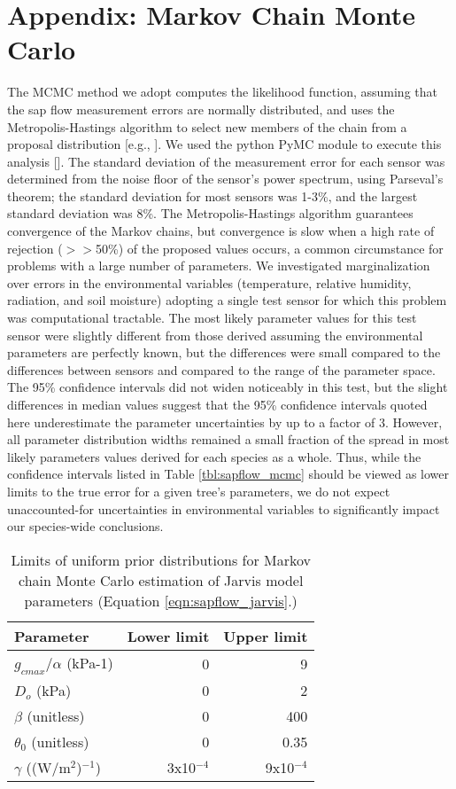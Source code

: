 \section{Appendix: Markov Chain Monte Carlo}
\label{sec:sapflow_appendix}

The MCMC method we adopt computes the likelihood function, assuming that the sap flow measurement errors are normally distributed, and uses the Metropolis-Hastings algorithm to select new members of the chain from a proposal distribution [e.g., \cite{sivia1996data}]. We used the python PyMC module to execute this analysis [\cite{patil}]. The standard deviation of the measurement error for each sensor was determined from the noise floor of the sensor's power spectrum, using Parseval's theorem; the standard deviation for most sensors was 1-3\%, and the largest standard deviation was 8\%.  The Metropolis-Hastings algorithm guarantees convergence of the Markov chains, but convergence is slow when a high rate of rejection ($>>$50\%) of the proposed values occurs, a common circumstance for problems with a large number of parameters.  We investigated marginalization over errors in the environmental variables (temperature, relative humidity, radiation, and soil moisture) adopting a single test sensor for which this problem was computational tractable.  The most likely parameter values for this test sensor were slightly different from those derived assuming the environmental parameters are perfectly known, but the differences were small compared to the differences between sensors and compared to the range of the parameter space.  The 95\% confidence intervals did not widen noticeably in this test, but the slight differences in median values suggest that the 95\% confidence intervals quoted here underestimate the parameter uncertainties by up to a factor of 3.  However, all parameter distribution widths remained a small fraction of the spread in most likely parameters values derived for each species as a whole.  Thus, while the confidence intervals listed in Table \ref{tbl:sapflow_mcmc} should be viewed as lower limits to the true error for a given tree's parameters, we do not expect unaccounted-for uncertainties in environmental variables to significantly impact our species-wide conclusions.

\begin{table}
  \caption{Limits of uniform prior distributions for Markov chain Monte Carlo estimation of Jarvis model parameters (Equation \ref{eqn:sapflow_jarvis}.)}
  \label{tbl:sapflow_priors}
  \begin{tabular}{l r r}
  \hline
  Parameter & Lower limit & Upper limit \\
  \hline
  $g_{cmax}/\alpha$ (kPa-1) & 0 & 9 \\
  $D_o$ (kPa) & 0 & 2 \\
  $\beta$ (unitless) & 0 & 400 \\
  $\theta_0$ (unitless) & 0 & 0.35 \\
  $\gamma$ ((W/m$^2$)$^{-1}$) & 3x10$^{-4}$ & 9x10$^{-4}$ \\
  \hline
  \end{tabular}
\end{table}

